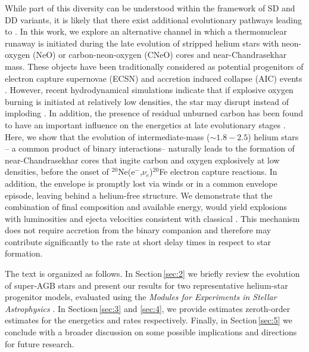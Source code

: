 \documentclass[twocolumn,tighten,times]{aastex62}
\begin{document}
While part of this diversity can be understood within the framework of SD and DD 
variants, it is likely that there exist additional 
evolutionary pathways leading to \ias. 
In this work, we explore an alternative channel in which a thermonuclear runaway 
is initiated during the late evolution of stripped helium stars with neon-oxygen 
(NeO) or carbon-neon-oxygen (CNeO) cores and near-Chandrasekhar mass. 
These objects have been traditionally considered as potential progenitors of 
electron capture supernovae (ECSN) and accretion induced collapse (AIC) events 
\citep[e.g.,][]{nomoto1991,gutierrez1996,Takahashi:2013ena}. However, recent 
hydrodynamical simulations indicate that if explosive oxygen burning is initiated 
at relatively low densities, the star may disrupt instead of imploding 
\citep{Jones:2018ule}. 
In addition, the presence of residual unburned carbon has been 
found to have an important influence on the energetics at  late evolutionary stages \citep{Willcox:2016yyp,Schwab:2018cnb}. 
Here, we show that the evolution of intermediate-mass ($\sim 1.8-2.5$\msun) 
helium stars -- a common product of binary interactions-- naturally leads to the formation of 
near-Chandrasekhar \one cores that ingite carbon and oxygen explosively at low densities, before the onset of {\rm 
$^{20}$Ne(e$^-$,$\nu_e$)$^{20}$Fe} electron capture reactions. 
In addition, the envelope is promptly lost via winds or in a common envelope 
episode, leaving behind a helium-free structure.  
We demonstrate that the combination of final composition and available energy, 
would yield explosions with luminosities and ejecta velocities 
consistent with classical \ias. 
 This mechanism  does not require accretion from the binary companion and 
 therefore may contribute significantly to the \ia  rate at short 
 delay times in respect to star formation. 
 
 The text is organized as follows. In Section\,\ref{sec:2} we briefly review the evolution of  super-AGB stars and present our results for two representative helium-star progenitor models, evaluated using the 
\textit{Modules for Experiments in Stellar Astrophysics}  
\citep[\mesa;][]{Paxton:2010ji,Paxton:2013pj,Paxton:2015jva,Paxton:2017eie}. 
In Sectiosn\,\ref{sec:3} and \ref{sec:4},  we provide estimates zeroth-order estimates for the energetics and  \ia rates respectively. Finally, in 
Section\,\ref{sec:5} we conclude with a broader discussion on some possible implications and directions for future research. 
\end{document}
